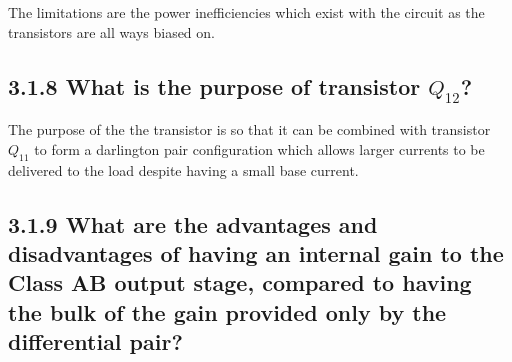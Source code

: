 \documentclass[12pt]{article}
\begin{document}
The limitations are the power inefficiencies which exist with the circuit as the transistors are all ways biased on. 

\subsection*{3.1.8 What is the purpose of transistor $Q_{12}$?}

The purpose of the the transistor is so that it can be combined with transistor $Q_11$ to form a darlington pair configuration which allows larger currents to be delivered to the load despite having a small base current.

\subsection*{3.1.9 What are the advantages and disadvantages of having an internal gain to the Class AB output stage, compared to having the bulk of the gain provided only by the differential pair?   }
\end{document}
